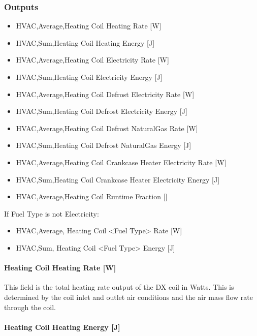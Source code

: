 \subsubsection{Outputs}\label{outputs-16}

\begin{itemize}
\item
  HVAC,Average,Heating Coil Heating Rate {[}W{]}
\item
  HVAC,Sum,Heating Coil Heating Energy {[}J{]}
\item
  HVAC,Average,Heating Coil Electricity Rate {[}W{]}
\item
  HVAC,Sum,Heating Coil Electricity Energy {[}J{]}
\item
  HVAC,Average,Heating Coil Defrost Electricity Rate {[}W{]}
\item
  HVAC,Sum,Heating Coil Defrost Electricity Energy {[}J{]}
\item
  HVAC,Average,Heating Coil Defrost NaturalGas Rate {[}W{]}
\item
  HVAC,Sum,Heating Coil Defrost NaturalGas Energy {[}J{]}
\item
  HVAC,Average,Heating Coil Crankcase Heater Electricity Rate {[}W{]}
\item
  HVAC,Sum,Heating Coil Crankcase Heater Electricity Energy {[}J{]}
\item
  HVAC,Average,Heating Coil Runtime Fraction {[]}
\end{itemize}

If Fuel Type is not Electricity:

\begin{itemize}
\item
  HVAC,Average, Heating Coil \textless{}Fuel Type\textgreater{} Rate {[}W{]}
\item
  HVAC,Sum, Heating Coil \textless{}Fuel Type\textgreater{} Energy {[}J{]}
\end{itemize}

\paragraph{Heating Coil Heating Rate {[}W{]}}\label{heating-coil-heating-rate-w-8}

This field is the total heating rate output of the DX coil in Watts. This is determined by the coil inlet and outlet air conditions and the air mass flow rate through the coil.

\paragraph{Heating Coil Heating Energy {[}J{]}}\label{heating-coil-heating-energy-j-8}

